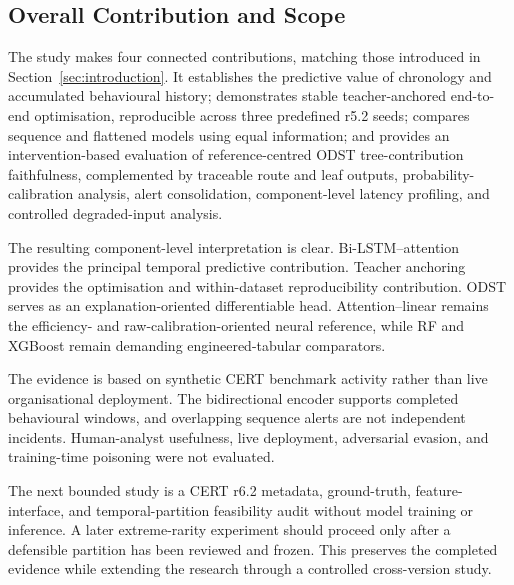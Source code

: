 \subsection{Overall Contribution and Scope}
\label{subsec:discussion_contribution}
The study makes four connected contributions, matching those introduced in
Section~\ref{sec:introduction}. It establishes the predictive value of
chronology and accumulated behavioural history; demonstrates stable
teacher-anchored end-to-end optimisation, reproducible across three
predefined r5.2 seeds; compares sequence and flattened models using equal
information; and provides an intervention-based evaluation of
reference-centred ODST tree-contribution faithfulness, complemented by
traceable route and leaf outputs, probability-calibration analysis, alert
consolidation, component-level latency profiling, and controlled
degraded-input analysis.

\smallskip
The resulting component-level interpretation is clear. Bi-LSTM--attention
provides the principal temporal predictive contribution. Teacher anchoring
provides the optimisation and within-dataset reproducibility contribution.
ODST serves as an explanation-oriented differentiable head.
Attention--linear remains the efficiency- and raw-calibration-oriented
neural reference, while RF and XGBoost remain demanding engineered-tabular
comparators.

\smallskip
The evidence is based on synthetic CERT benchmark activity rather than live
organisational deployment. The bidirectional encoder supports completed
behavioural windows, and overlapping sequence alerts are not independent
incidents. Human-analyst usefulness, live deployment, adversarial evasion,
and training-time poisoning were not evaluated.

\smallskip
The next bounded study is a CERT r6.2 metadata, ground-truth,
feature-interface, and temporal-partition feasibility audit without model
training or inference. A later extreme-rarity experiment should proceed only
after a defensible partition has been reviewed and frozen. This preserves
the completed evidence while extending the research through a controlled
cross-version study.